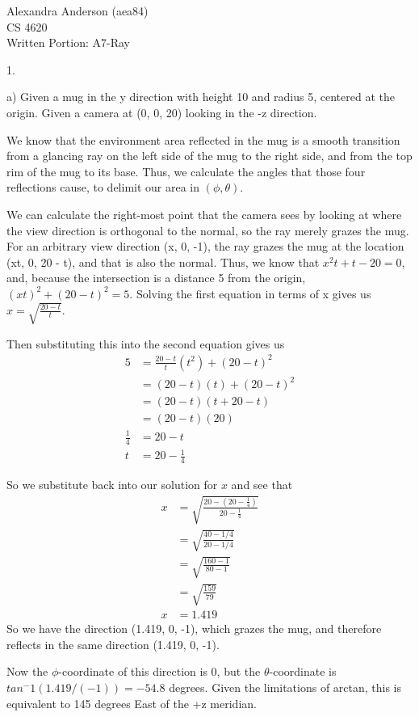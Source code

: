 \documentclass{letter}
\begin{document}
Alexandra Anderson (aea84) \\
CS 4620 \\
Written Portion: A7-Ray

1.

a) Given a mug in the y direction with height 10 and radius 5, centered at the origin. Given a camera at (0, 0, 20) looking in the -z direction.

We know that the environment area reflected in the mug is a smooth transition from a glancing ray on the left side of the mug to the right side, and from the top rim of the mug to its base. Thus, we calculate the angles that those four reflections cause, to delimit our area in $(\phi, \theta)$.

We can calculate the right-most point that the camera sees by looking at where the view direction is orthogonal to the normal, so the ray merely grazes the mug. For an arbitrary view direction (x, 0, -1), the ray grazes the mug at the location (xt, 0, 20 - t), and that is also the normal. Thus, we know that $x^2t + t - 20 = 0$, and, because the intersection is a distance 5 from the origin, $(xt)^2 + (20 - t)^2 = 5$. Solving the first equation in terms of x gives us $x = \sqrt{\frac{20 - t}{t}}$. 

Then substituting this into the second equation gives us 
\begin{align*}
5 &= \frac{20 - t}{t}(t^2) + (20 - t)^2 \\
&= (20 -t)(t) + (20 - t)^2 \\
&= (20 - t)(t + 20 - t) \\
&= (20 - t)(20) \\
\frac{1}{4} &= 20 - t\\
t &= 20 - \frac{1}{4}
\end{align*}

So we substitute back into our solution for $x$ and see that 
\begin{align*}
x &= \sqrt{\frac{20 - (20 - \frac{1}{4})}{20 - \frac{1}{4}}} \\
&= \sqrt{\frac{40 - 1/4}{20 - 1/4}} \\
&= \sqrt{\frac{160 - 1}{80 - 1}} \\
&= \sqrt{\frac{159}{79}} \\
x &= 1.419 
\end{align*}
So we have the direction (1.419, 0, -1), which grazes the mug, and therefore reflects in the same direction (1.419, 0, -1). 

Now the $\phi$-coordinate of this direction is 0, but the $\theta$-coordinate is $tan^-1(1.419/(-1)) = -54.8$ degrees. Given the limitations of arctan, this is equivalent to 145 degrees East of the +z meridian. 
\end{document}

